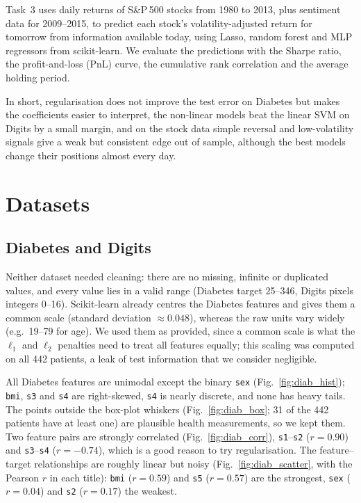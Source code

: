 \documentclass[conference]{IEEEtran}
\begin{document}
Task~3 uses daily returns of S\&P\,500 stocks from 1980 to 2013, plus sentiment data for 2009--2015, to predict each stock's volatility-adjusted return for tomorrow from information available today, using Lasso, random forest and MLP regressors from scikit-learn. We evaluate the predictions with the Sharpe ratio, the profit-and-loss (PnL) curve, the cumulative rank correlation and the average holding period.

In short, regularisation does not improve the test error on Diabetes but makes the coefficients easier to interpret, the non-linear models beat the linear SVM on Digits by a small margin, and on the stock data simple reversal and low-volatility signals give a weak but consistent edge out of sample, although the best models change their positions almost every day.

\section{Datasets}
\subsection{Diabetes and Digits}
Neither dataset needed cleaning: there are no missing, infinite or duplicated values, and every value lies in a valid range (Diabetes target 25--346, Digits pixels integers 0--16). Scikit-learn already centres the Diabetes features and gives them a common scale (standard deviation $\approx0.048$), whereas the raw units vary widely (e.g.\ 19--79 for age). We used them as provided, since a common scale is what the $\ell_1$ and $\ell_2$ penalties need to treat all features equally; this scaling was computed on all 442 patients, a leak of test information that we consider negligible.

All Diabetes features are unimodal except the binary \texttt{sex} (Fig.~\ref{fig:diab_hist}); \texttt{bmi}, \texttt{s3} and \texttt{s4} are right-skewed, \texttt{s4} is nearly discrete, and none has heavy tails. The points outside the box-plot whiskers (Fig.~\ref{fig:diab_box}; 31 of the 442 patients have at least one) are plausible health measurements, so we kept them. Two feature pairs are strongly correlated (Fig.~\ref{fig:diab_corr}), \texttt{s1}--\texttt{s2} ($r=0.90$) and \texttt{s3}--\texttt{s4} ($r=-0.74$), which is a good reason to try regularisation. The feature--target relationships are roughly linear but noisy (Fig.~\ref{fig:diab_scatter}, with the Pearson $r$ in each title): \texttt{bmi} ($r=0.59$) and \texttt{s5} ($r=0.57$) are the strongest, \texttt{sex} ($r=0.04$) and \texttt{s2} ($r=0.17$) the weakest.
\end{document}
